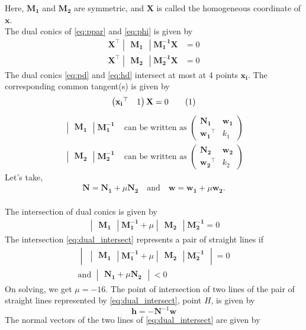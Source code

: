 \documentclass[journal,12pt,twocolumn]{IEEEtran}
\let\vec\mathbf
\newcommand{\myvec}[1]{\ensuremath{\begin{pmatrix}#1\end{pmatrix}}}
\newcommand{\mydet}[1]{\ensuremath{\begin{vmatrix}#1\end{vmatrix}}}
\providecommand{\brak}[1]{\ensuremath{\left(#1\right)}}
\newcommand\numberthis{\addtocounter{equation}{1}\tag{\theequation}}
\begin{document}
Here, $\vec{M_1}$ and $\vec{M_2}$ are symmetric, and $\vec{X}$ is called the homogeneous coordinate of $\vec{x}$. \\
The dual conics of \eqref{eq:ppar} and \eqref{eq:phi} is given by
\begin{align}
		\vec{X}^{\top}\mydet{\vec{M_1}}\vec{M_1^{-1}}\vec{X} &= 0 \label{eq:pd} \\
		\vec{X}^{\top}\mydet{\vec{M_2}}\vec{M_2^{-1}}\vec{X} &= 0 \label{eq:hd} 
\end{align}
The dual conics \eqref{eq:pd} and \eqref{eq:hd} intersect at most at 4 points $\vec{x_i}$. The corresponding common tangent(s) is given by \[ \myvec{\vec{x_i}^{\top}&1}\vec{X}=0 \label{eq:tangent_eqn} \numberthis \]
\begin{align}
		\mydet{\vec{M_1}}\vec{M_1^{-1}} &\text{ can be written as } \myvec{\vec{N_1}&\vec{w_1}\\\vec{w_1}^{\top}&k_1} \\[0.5ex]
		\mydet{\vec{M_2}}\vec{M_2^{-1}} &\text{ can be written as } \myvec{\vec{N_2}&\vec{w_2}\\\vec{w_2}^{\top}&k_2}
\end{align}
Let's take, 
\begin{align}
		\vec{N} = \vec{N_1}+\mu\vec{N_2} \quad \text{and} \quad
		\vec{w} = \vec{w_1}+\mu\vec{w_2} \text{.}
\end{align}
\\
The intersection of dual conics is given by
\begin{align}
\mydet{\vec{M_1}}\vec{M_1^{-1}}+\mu\mydet{\vec{M_2}}\vec{M_2^{-1}} = 0 \label{eq:dual_intersect}
\end{align}
The intersection \eqref{eq:dual_intersect} represents a pair of straight lines if 
\begin{gather}
		\mydet{\mydet{\vec{M_1}}\vec{M_1^{-1}}+\mu\mydet{\vec{M_2}}\vec{M_2^{-1}}} = 0 \\
	\text{and }	\mydet{\vec{N_1}+\mu\vec{N_2}} < 0	
\end{gather}
On solving, we get $\mu=-16$. %
The point of intersection of two lines of the pair of straight lines represented by \eqref{eq:dual_intersect}, point $H$, is given by %
\begin{equation}
		\vec{h} = -\vec{N}^{-1}\vec{w} %
\end{equation}
The normal vectors of the two lines of \eqref{eq:dual_intersect} are given by
\end{document}
